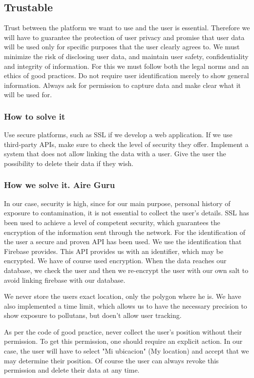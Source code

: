 \subsection{Trustable}
Trust between the platform we want to use and the user is essential.
Therefore we will have to guarantee the protection of user privacy and promise that user data will be used only for specific purposes that the user clearly agrees to.
We must minimize the risk of disclosing user data, and maintain user safety, confidentiality and integrity of information.
For this we must follow both the legal norms and an ethics of good practices.
Do not require user identification merely to show general information.
Always ask for permission to capture data and make clear what it will be used for.

\subsubsection{How to solve it} 
Use secure platforms, such as SSL if we develop a web application.
If we use third-party APIs, make sure to check the level of security they offer.
Implement a system that does not allow linking the data with a user.
Give the user the possibility to delete their data if they wish.


\subsubsection{How we solve it. Aire Guru} 
In our case, security is high, since for our main purpose, personal history
of exposure to contamination, it is not essential to collect the user's details.
SSL has been used to achieve a level of competent security, which guarantees the encryption of
the information sent through the network.
For the identification of the user a secure and proven API has been used. We use the identification
that Firebase provides. This API provides us with an identifier, which may be encrypted.
We have of course used encryption. When the data reaches our database,
we check the user and then we re-encrypt the user with our own salt to
avoid linking firebase with our database.

We never store the users exact location, only the polygon where he is.
We have also implemented a time limit, which allows us to have the necessary precision to show exposure to pollutans, but doen't allow user tracking.

As per the code of good practice, never collect the user's position without their permission.
To get this permission, one should require an explicit action. In our case, the user will have to select "Mi ubicacion" (My location) and accept 
that we may determine their position. Of course the user can always revoke this permission and
delete their data at any time. \\

